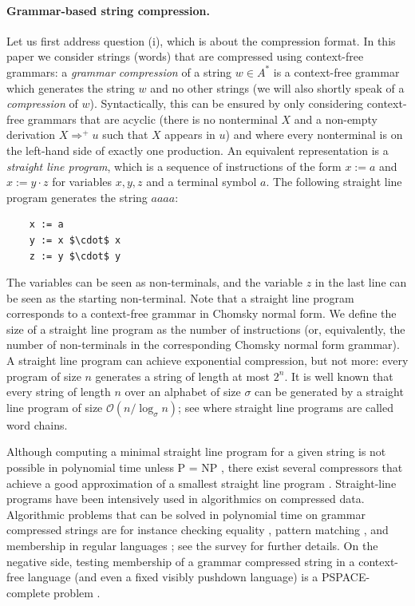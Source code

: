 \documentclass{article}
\begin{document}
\paragraph{Grammar-based string compression.}
Let us first address question (i), which is about the compression format. In this paper we consider strings (words) that are compressed using context-free grammars: a \emph{grammar compression} of a string $w \in A^*$ is a context-free grammar which generates the string $w$ and no other strings (we will also shortly speak of a 
\emph{compression} of $w$). Syntactically, this can be ensured by only considering context-free grammars that are acyclic (there is no nonterminal $X$ and a non-empty derivation $X \Rightarrow^+ u$ such that $X$ appears in $u$) and where every nonterminal is on the left-hand side of exactly one production.
  An equivalent representation is a \emph{straight line program}, which is a sequence of instructions 
  of the form $x := a$ and $x := y \cdot z$ for variables $x,y,z$ and a terminal symbol $a$.
 The following straight line program generates the string $aaaa$:
\begin{lstlisting}
    x := a
    y := x $\cdot$ x
    z := y $\cdot$ y
\end{lstlisting}
The variables can be seen as non-terminals, and the variable $z$ in the last line can be seen as the starting non-terminal. 
Note that a straight line program corresponds to a context-free grammar in Chomsky normal form. We define the size of 
a straight line program as the number of instructions (or, equivalently, the number of non-terminals in the corresponding Chomsky
normal form grammar).
A straight line  program can achieve exponential compression, but not more: every program of size $n$ generates a string of length at most $2^n$.
It is well known that every string of length $n$ over an alphabet of size $\sigma$ can be generated by a straight line program of size
$\mathcal{O}(n / \log_\sigma n)$; see \cite[Proposition~3.1]{BerstelB87} where straight line programs are called word chains.

Although computing a minimal straight line  program for a given string is not possible in polynomial time unless \textsf{P} = \textsf{NP} \cite[Theorem~1]{CLLLPPSS05},
there exist several compressors that achieve a good approximation of a smallest straight line program \cite{CLLLPPSS05,Jez15approx,Ryt03}.
Straight-line programs have been intensively used in algorithmics on compressed data. 
Algorithmic problems that can be solved in polynomial time on grammar compressed strings are for instance
checking equality \cite{HirshfeldJM94,MehlhornSU94,Pla94}, pattern matching \cite{KRS95,Jez15}, and membership in regular languages \cite{PlandowskiR99}; see the survey \cite{Loh12survey} for further details.
On the negative side, testing membership of a grammar compressed string in a context-free language (and even a fixed
visibly pushdown language) is a \textsf{PSPACE}-complete problem \cite[Theorem 9]{Lohrey11}.
\end{document}
